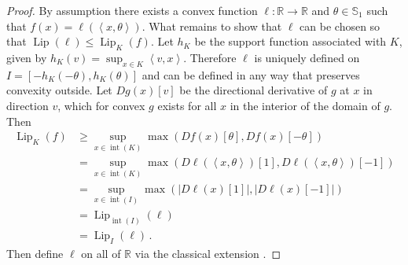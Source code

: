 \documentclass[letter, 12pt]{report}
\newcommand{\R}{\mathbb R}
\newcommand{\ip}[1]{\left \langle #1 \right \rangle}
\newcommand{\sphere}{\mathbb{S}}
\newcommand{\lip}{\operatorname{Lip}}
\newcommand{\interior}{\operatorname{int}}
\newcommand{\1}{\mathbf{1}}
\theoremstyle{plain}
\theoremstyle{definition}
\theoremstyle{remark}
\begin{document}
\begin{proof}
    By assumption there exists a convex function $\ell : \R \to \R$ and $\theta \in \sphere_1$ such that $f(x) = \ell(\ip{x, \theta})$.
    What remains to show that $\ell$ can be chosen so that $\lip(\ell) \leq \lip_K(f)$.
    Let $h_K$ be the support function associated with $K$, given by $h_K(v) = \sup_{x \in K} \ip{v, x}$.
    Therefore $\ell$ is uniquely defined on $I = [-h_K(-\theta), h_K(\theta)]$ and can be defined in any way that preserves convexity outside.
    Let $Dg(x)[v]$ be the directional derivative of $g$ at $x$ in direction $v$, which for convex $g$ exists for all $x$ in the interior of the domain of $g$.
    Then
    \begin{align*}
        \lip_K(f)
         & \geq \sup_{x \in \interior(K)} \max(Df(x)[\theta], Df(x)[-\theta])                  \\
         & = \sup_{x \in \interior(K)} \max(D\ell(\ip{x,\theta})[1], D\ell(\ip{x,\theta})[-1]) \\
         & = \sup_{x \in \interior(I)} \max(|D\ell(x)[1]|, |D\ell(x)[-1]|)                     \\
         & = \lip_{\interior(I)}(\ell)                                                         \\
         & = \lip_I(\ell) \,.
    \end{align*}
    Then define $\ell$ on all of $\R$ via the classical extension \citep[Proposition 3.18, for example]{lat24book}.
\end{proof}
\end{document}

